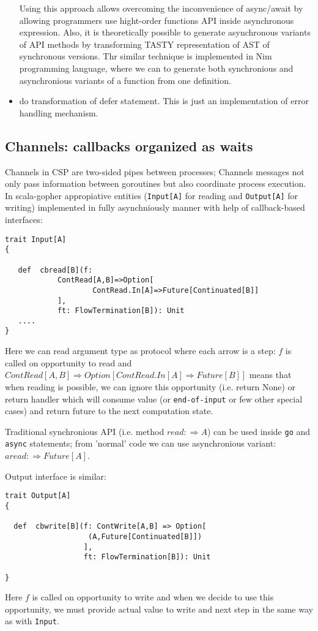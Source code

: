 \documentclass[12pt]{article}
\newcommand{\To}{\Rightarrow}
\begin{document}
\begin{itemize}
 Using this approach allows overcoming the inconvenience of async/await by allowing programmers use hight-order functions API inside asynchronous expression. Also, it is theoretically possible to generate asynchronous variants of API methods by transforming TASTY representation of AST of synchronous versions. Thr similar technique is implemented in Nim \cite{Nim} programming language, where we can to generate both synchronious and asynchronious variants of a function from one definition.
  
 \item do transformation of defer statement. This is just an implementation of error handling mechanism.

\end{itemize}

\subsection{Channels: callbacks organized as waits}

  Channels in CSP are two-sided pipes between processes; Channels messages not only pass information between goroutines but also coordinate process execution.
  In scala-gopher appropiative entities (\verb|Input[A]| for reading and \verb|Output[A]| for writing) implemented in fully asynchniously manner with help of callback-based interfaces:

\begin{Verbatim}[fontsize=\small]
trait Input[A]
{

   def  cbread[B](f:
            ContRead[A,B]=>Option[
                    ContRead.In[A]=>Future[Continuated[B]]
            ],
            ft: FlowTermination[B]): Unit
   ....
}
\end{Verbatim}

  Here we can read argument type as protocol where each arrow is a step: 
    $f$ is called on opportunity to read and
      $ContRead[A,B] \To Option[ContRead.In[A] \To Future[B]]$ means that when reading is 
   possible, we can ignore this opportunity (i.e. return None) or return handler which will
   consume value (or \verb|end-of-input| or few other special cases) and return future to the next 
   computation state.

  Traditional synchronious API  (i.e. method $read:\To A$) can be used inside \verb|go| and \verb|async| statements; from 'normal' code we can use asynchronious variant: $aread: \To Future[A]$.

  Output interface is similar:
\begin{Verbatim}[fontsize=\small]
trait Output[A] 
{

  def  cbwrite[B](f: ContWrite[A,B] => Option[
                   (A,Future[Continuated[B]])
                  ],
                  ft: FlowTermination[B]): Unit
  
}
\end{Verbatim}
  Here $f$ is called on opportunity to write and when we decide to use this opportunity, we
 must provide actual value to write and next step in the same way as with \verb|Input|.
\end{document}
